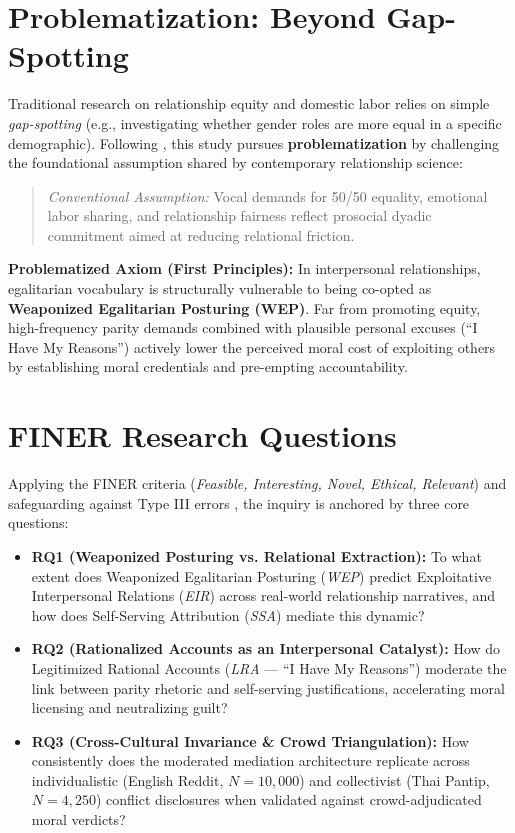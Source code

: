\documentclass[11pt,a4paper]{article}
\begin{document}
\section{Problematization: Beyond Gap-Spotting}
Traditional research on relationship equity and domestic labor relies on simple \textit{gap-spotting} (e.g., investigating whether gender roles are more equal in a specific demographic). Following \citet{alvesson2011generating}, this study pursues \textbf{problematization} by challenging the foundational assumption shared by contemporary relationship science:
\begin{quote}
\textit{Conventional Assumption:} Vocal demands for 50/50 equality, emotional labor sharing, and relationship fairness reflect prosocial dyadic commitment aimed at reducing relational friction.
\end{quote}
\textbf{Problematized Axiom (First Principles):} In interpersonal relationships, egalitarian vocabulary is structurally vulnerable to being co-opted as \textbf{Weaponized Egalitarian Posturing (WEP)}. Far from promoting equity, high-frequency parity demands combined with plausible personal excuses (``I Have My Reasons'') actively lower the perceived moral cost of exploiting others by establishing moral credentials and pre-empting accountability.

\section{FINER Research Questions}
Applying the FINER criteria (\textit{Feasible, Interesting, Novel, Ethical, Relevant}) and safeguarding against Type III errors \citep{alvesson2011generating}, the inquiry is anchored by three core questions:
\begin{itemize}
    \item \textbf{RQ1 (Weaponized Posturing vs. Relational Extraction):} To what extent does Weaponized Egalitarian Posturing (\textit{WEP}) predict Exploitative Interpersonal Relations (\textit{EIR}) across real-world relationship narratives, and how does Self-Serving Attribution (\textit{SSA}) mediate this dynamic?
    \item \textbf{RQ2 (Rationalized Accounts as an Interpersonal Catalyst):} How do Legitimized Rational Accounts (\textit{LRA} --- ``I Have My Reasons'') moderate the link between parity rhetoric and self-serving justifications, accelerating moral licensing and neutralizing guilt?
    \item \textbf{RQ3 (Cross-Cultural Invariance \& Crowd Triangulation):} How consistently does the moderated mediation architecture replicate across individualistic (English Reddit, $N = 10,000$) and collectivist (Thai Pantip, $N = 4,250$) conflict disclosures when validated against crowd-adjudicated moral verdicts?
\end{itemize}
\end{document}
